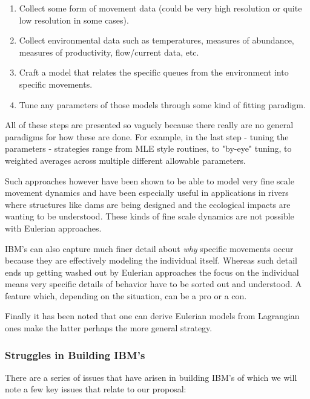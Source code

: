 \documentclass[11pt]{article}
\begin{document}
\begin{enumerate}
\item Collect some form of movement data (could be very high resolution or quite low resolution in some cases).
\item Collect environmental data such as temperatures, measures of abundance, measures of productivity, flow/current data, etc.
\item Craft a model that relates the specific queues from the environment into specific movements.
\item Tune any parameters of those models through some kind of fitting paradigm.
\end{enumerate}

All of these steps are presented so vaguely because there really are no general paradigms for how these are done. For example, in the last step - tuning the parameters - strategies range from MLE style routines, to "by-eye" tuning, to weighted averages across multiple different allowable parameters. \newline

Such approaches however have been shown to be able to model very fine scale movement dynamics and have been especially useful in applications in rivers where structures like dams are being designed and the ecological impacts are wanting to be understood. These kinds of fine scale dynamics are not possible with Eulerian approaches. 

IBM's can also capture much finer detail about \textit{why} specific movements occur because they are effectively modeling the individual itself. Whereas such detail ends up getting washed out by Eulerian approaches the focus on the individual means very specific details of behavior have to be sorted out and understood. A feature which, depending on the situation, can be a pro or a con. 

Finally it has been noted that one can derive Eulerian models from Lagrangian ones make the latter perhaps the more general strategy. \newline

\subsubsection{Struggles in Building IBM's}

There are a series of issues that have arisen in building IBM's of which we will note a few key issues that relate to our proposal:
\end{document}
